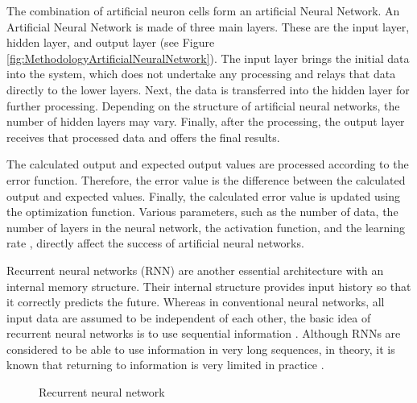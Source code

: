 The combination of artificial neuron cells form an artificial Neural Network. An Artificial Neural Network is made of three main layers. These are the input layer, hidden layer, and output layer (see Figure \ref{fig:MethodologyArtificialNeuralNetwork}). The input layer brings the initial data into the system, which does not undertake any processing and relays that data directly to the lower layers. Next, the data is transferred into the hidden layer for further processing. Depending on the structure of artificial neural networks, the number of hidden layers may vary. Finally, after the processing, the output layer receives that processed data and offers the final results. 

The calculated output and expected output values are processed according to the error function. Therefore, the error value is the difference between the calculated output and expected values. Finally, the calculated error value is updated using the optimization function. Various parameters, such as the number of data, the number of layers in the neural network, the activation function, and the learning rate \cite{goodfellow2016deep}, directly affect the success of artificial neural networks.

Recurrent neural networks (RNN) are another essential architecture with an internal memory structure. Their internal structure provides input history so that it correctly predicts the future. Whereas in conventional neural networks, all input data are assumed to be independent of each other, the basic idea of recurrent neural networks is to use sequential information \cite{medsker1999recurrent}. Although RNNs are considered to be able to use information in very long sequences, in theory, it is known that returning to information is very limited in practice \cite{medsker1999recurrent}.

\begin{figure}[htbp]
\centering
{}
\caption{Recurrent neural network \cite{quiza2009computational}}
\label{fig:MethodologyRecurrentNeuralNetwork}
\end{figure}

